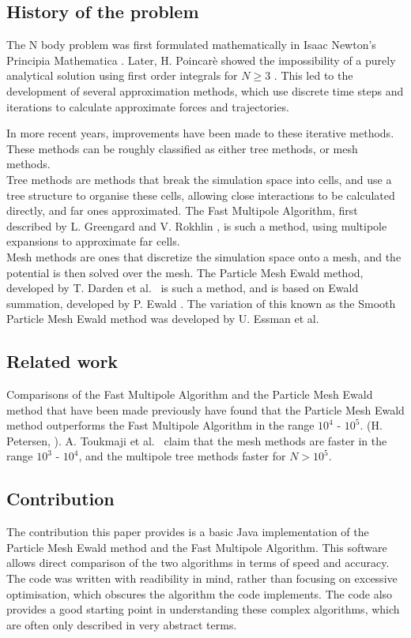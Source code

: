 \documentclass[pdftex,twoside,a4paper]{report}
\newcommand{\pmem}{Particle Mesh Ewald method}
\newcommand{\fma}{Fast Multipole Algorithm}
\begin{document}
    \subsection{History of the problem}
    The N body problem was first formulated mathematically in Isaac Newton's Principia Mathematica \cite{principia}. Later, H. Poincar\`{e} showed the impossibility of a purely analytical solution using first order integrals for $N \geq 3$ \cite{poincare}. This led to the development of several approximation methods, which use discrete time steps and iterations to calculate approximate forces and trajectories.
    
    In more recent years, improvements have been made to these iterative methods. These methods can be roughly classified as either tree methods, or mesh methods.\\
    
    Tree methods are methods that break the simulation space into cells, and use a tree structure to organise these cells, allowing close interactions to be calculated directly, and far ones approximated. The \fma{}, first described by L. Greengard and V. Rokhlin \cite{greengard:315}, is such a method, using multipole expansions to approximate far cells.\\
    
    Mesh methods are ones that discretize the simulation space onto a mesh, and the potential is then solved over the mesh. The \pmem{}, developed by T. Darden et al.\ \cite{darden:10089} is such a method, and is based on Ewald summation, developed by P. Ewald \cite{ewald}. The variation of this known as the Smooth \pmem{} was developed by U. Essman et al.\ \cite{essmann:8577}\\
    \subsection{Related work}
    Comparisons of the \fma{} and the \pmem{} that have been made previously have found that the \pmem{} outperforms the \fma{} in the range $10^4$ - $10^5$. (H. Petersen, \cite{petersen:3668}). A. Toukmaji et al.\ \cite{toukmaji:73} claim that the mesh methods are faster in the range $10^3$ - $10^4$, and the multipole tree methods faster for $N > 10^5$.
    \subsection{Contribution}
    The contribution this paper provides is a basic Java implementation of the \pmem{} and the \fma{}. This software allows direct comparison of the two algorithms in terms of speed and accuracy. The code was written with readibility in mind, rather than focusing on excessive optimisation, which obscures the algorithm the code implements. The code also provides a good starting point in understanding these complex algorithms, which are often only described in very abstract terms.
    
\end{document}
